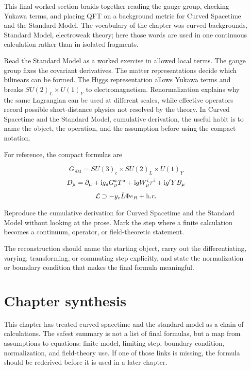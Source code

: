 This final worked section braids together reading the gauge group, checking Yukawa terms, and placing QFT on a background metric for Curved Spacetime and the Standard Model.  The vocabulary of the chapter was curved backgrounds, Standard Model, electroweak theory; here those words are used in one continuous calculation rather than in isolated fragments.

Read the Standard Model as a worked exercise in allowed local terms.  The gauge group fixes the covariant derivatives.  The matter representations decide which bilinears can be formed.  The Higgs representation allows Yukawa terms and breaks \(SU(2)_L\times U(1)_Y\) to electromagnetism.  Renormalization explains why the same Lagrangian can be used at different scales, while effective operators record possible short-distance physics not resolved by the theory.  In Curved Spacetime and the Standard Model, cumulative derivation, the useful habit is to name the object, the operation, and the assumption before using the compact notation.

For reference, the compact formulas are

\[
  G_{\mathrm{SM}}=SU(3)_c\times SU(2)_L\times U(1)_Y
\]
\[
  D_\mu=\partial_\mu+\mathrm i g_sG_\mu^aT^a+\mathrm i gW_\mu^i\tau^i+\mathrm i g'YB_\mu
\]
\[
  \mathcal L\supset -y_e\bar L\Phi e_R+\hbox{h.c.}
\]

\begin{exercise}
Reproduce the cumulative derivation for Curved Spacetime and the Standard Model without looking at the prose.  Mark the step where a finite calculation becomes a continuum, operator, or field-theoretic statement.
\begin{answer}
The reconstruction should name the starting object, carry out the differentiating, varying, transforming, or commuting step explicitly, and state the normalization or boundary condition that makes the final formula meaningful.
\end{answer}
\end{exercise}



\section{Chapter synthesis}

This chapter has treated curved spacetime and the standard model as a chain of calculations.  The safest summary is not a list of final formulas, but a map from assumptions to equations: finite model, limiting step, boundary condition, normalization, and field-theory use.  If one of those links is missing, the formula should be rederived before it is used in a later chapter.

